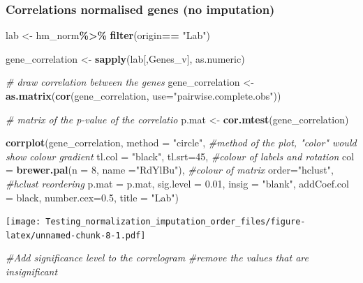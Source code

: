 \documentclass[
]{article}
\newenvironment{Shaded}{\begin{snugshade}}{\end{snugshade}}
\newcommand{\AttributeTok}[1]{\textcolor[rgb]{0.13,0.29,0.53}{#1}}
\newcommand{\CommentTok}[1]{\textcolor[rgb]{0.56,0.35,0.01}{\textit{#1}}}
\newcommand{\DecValTok}[1]{\textcolor[rgb]{0.00,0.00,0.81}{#1}}
\newcommand{\FloatTok}[1]{\textcolor[rgb]{0.00,0.00,0.81}{#1}}
\newcommand{\FunctionTok}[1]{\textcolor[rgb]{0.13,0.29,0.53}{\textbf{#1}}}
\newcommand{\NormalTok}[1]{#1}
\newcommand{\OtherTok}[1]{\textcolor[rgb]{0.56,0.35,0.01}{#1}}
\newcommand{\SpecialCharTok}[1]{\textcolor[rgb]{0.81,0.36,0.00}{\textbf{#1}}}
\newcommand{\StringTok}[1]{\textcolor[rgb]{0.31,0.60,0.02}{#1}}
\begin{document}
\hypertarget{correlations-normalised-genes-no-imputation}{%
\subsubsection{Correlations normalised genes (no
imputation)}\label{correlations-normalised-genes-no-imputation}}

\begin{Shaded}
\begin{Highlighting}[]
\NormalTok{lab }\OtherTok{\textless{}{-}}\NormalTok{ hm\_norm}\SpecialCharTok{\%\textgreater{}\%}
    \FunctionTok{filter}\NormalTok{(origin}\SpecialCharTok{==} \StringTok{"Lab"}\NormalTok{)}

\NormalTok{gene\_correlation }\OtherTok{\textless{}{-}} \FunctionTok{sapply}\NormalTok{(lab[,Genes\_v], as.numeric)}

\CommentTok{\# draw correlation between the genes}
\NormalTok{gene\_correlation }\OtherTok{\textless{}{-}} \FunctionTok{as.matrix}\NormalTok{(}\FunctionTok{cor}\NormalTok{(gene\_correlation, }
                                  \AttributeTok{use=}\StringTok{"pairwise.complete.obs"}\NormalTok{))}

\CommentTok{\# matrix of the p{-}value of the correlatio}
\NormalTok{p.mat }\OtherTok{\textless{}{-}} \FunctionTok{cor.mtest}\NormalTok{(gene\_correlation)}

\FunctionTok{corrplot}\NormalTok{(gene\_correlation, }
         \AttributeTok{method =} \StringTok{"circle"}\NormalTok{,  }\CommentTok{\#method of the plot, "color" would show colour gradient}
         \AttributeTok{tl.col =} \StringTok{"black"}\NormalTok{, }\AttributeTok{tl.srt=}\DecValTok{45}\NormalTok{, }\CommentTok{\#colour of labels and rotation}
         \AttributeTok{col =} \FunctionTok{brewer.pal}\NormalTok{(}\AttributeTok{n =} \DecValTok{8}\NormalTok{, }\AttributeTok{name =}\StringTok{"RdYlBu"}\NormalTok{), }\CommentTok{\#colour of matrix}
         \AttributeTok{order=}\StringTok{"hclust"}\NormalTok{, }\CommentTok{\#hclust reordering}
         \AttributeTok{p.mat =}\NormalTok{ p.mat, }\AttributeTok{sig.level =} \FloatTok{0.01}\NormalTok{, }\AttributeTok{insig =} \StringTok{"blank"}\NormalTok{,}
         \AttributeTok{addCoef.col =} \StringTok{\textquotesingle{}black\textquotesingle{}}\NormalTok{,}
         \AttributeTok{number.cex=}\FloatTok{0.5}\NormalTok{,}
         \AttributeTok{title =} \StringTok{"Lab"}\NormalTok{) }
\end{Highlighting}
\end{Shaded}

\texttt{[image: Testing\_normalization\_imputation\_order\_files/figure-latex/unnamed-chunk-8-1.pdf]}

\begin{Shaded}
\begin{Highlighting}[]
  \CommentTok{\#Add significance level to the correlogram}
\CommentTok{\#remove the values that are insignificant}
\end{Highlighting}
\end{Shaded}
\end{document}
